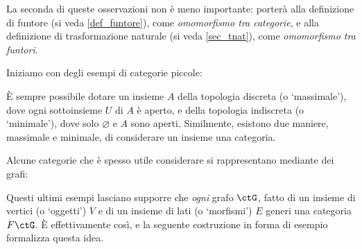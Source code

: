 La seconda di queste osservazioni non è meno importante: porterà alla definizione di funtore (si veda \autoref{def_funtore}), come \emph{omomorfismo tra categorie}, e alla definizione di trasformazione naturale (si veda \autoref{sec_tnat}), come \emph{omomorfismo tra funtori}.

Iniziamo con degli esempi di categorie piccole:
\begin{example}
\end{example}
\begin{example}
\end{example}
\`E sempre possibile dotare un insieme \(A\) della topologia discreta (o `massimale'), dove ogni sottoinsieme \(U\) di \(A\) è aperto, e della topologia indiscreta (o `minimale'), dove solo \(\varnothing\) e \(A\) sono aperti. Similmente, esistono due maniere, massimale e minimale, di considerare un insieme una categoria.
\begin{example}
\end{example}
\begin{example}
\end{example}
Alcune categorie che è spesso utile considerare si rappresentano mediante dei grafi:
\begin{example}
\end{example}
\begin{example}
\end{example}
\begin{example}
\end{example}
\begin{example}
\end{example}
\begin{example}
\end{example}
Questi ultimi esempi lasciano supporre che \emph{ogni} grafo \(\ctG\), fatto di un insieme di vertici (o `oggetti') \(V\) e di un insieme di lati (o `morfismi') \(E\) generi una categoria \(F\ctG\). \`E effettivamente così, e la seguente costruzione in forma di esempio formalizza questa idea.
